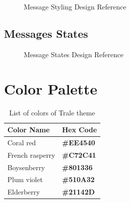 \begin{figure}[ht]
    \caption{Message Styling Design Reference}
    \centering\def\svgwidth{15cm}\label{fig:figure2}
\end{figure}


\subsection{Messages States}\label{subsec:messages-states}
\begin{figure}[ht]
    \caption{Message States Design Reference}
    \centering\def\svgwidth{15cm}\label{fig:figure3}
\end{figure}

\section{Color Palette}\label{sec:color-palette}

\begin{table}
    \centering
    \begin{tabular}{|l|l|}
        \hline
        \textbf{Color Name} & \textbf{Hex Code}\\ \hline
        Coral red & \color[HTML]{EE4540}\textbf{\#EE4540} \\ \hline
        French rasperry & \color[HTML]{C72C41}\textbf{\#C72C41} \\ \hline
        Boysenberry & \color[HTML]{801336}\textbf{\#801336} \\ \hline
        Plum violet & \color[HTML]{510A32}\textbf{\#510A32} \\ \hline
        Elderberry & \color[HTML]{21142D}\textbf{\#21142D} \\ \hline
    \end{tabular}
    \caption{List of colors of Trale theme}
    \label{tab:colorTable}
\end{table}

